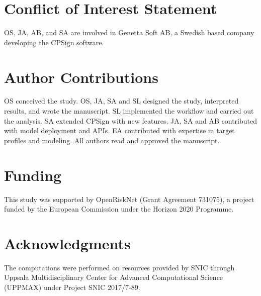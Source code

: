 \documentclass[utf8]{frontiersSCNS} %
\begin{document}
\section{Conflict of Interest Statement}
OS, JA, AB, and SA are involved in Genetta Soft AB, a Swedish based company
developing the CPSign software.


\section{Author Contributions}
OS conceived the study. OS, JA, SA and SL designed the study, interpreted
results, and wrote the manuscript. SL implemented the workflow and carried out
the analysis. SA extended CPSign with new features. JA, SA and AB contributed
with model deployment and APIs. EA contributed with expertise in target
profiles and modeling. All authors read and approved the manuscript.



\section{Funding}
This study was supported by OpenRiskNet (Grant Agreement 731075), a project
funded by the European Commission under the Horizon 2020 Programme.

\section{Acknowledgments}
The computations were performed on resources provided by SNIC through Uppsala
Multidisciplinary Center for Advanced Computational Science (UPPMAX) under
Project SNIC 2017/7-89.



\end{document}
